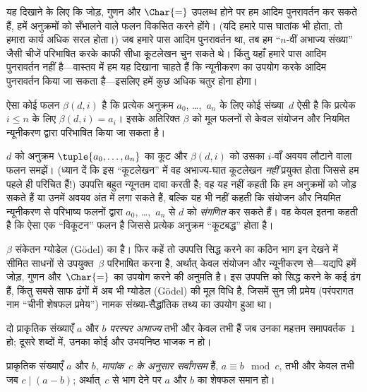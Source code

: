 \documentclass[../../../include/open-logic-section]{subfiles}
\begin{document}

यह दिखाने के लिए कि जोड़, गुणन और $\Char{=}$ उपलब्ध होने पर हम आदिम
पुनरावर्तन कर सकते हैं, हमें अनुक्रमों को सँभालने वाले फलन विकसित करने
होंगे। (यदि हमारे पास घातांक भी होता, तो हमारा कार्य अधिक सरल होता।) जब
हमारे पास आदिम पुनरावर्तन था, तब हम ``$n$-वीं अभाज्य संख्या'' जैसी चीजें
परिभाषित करके काफी सीधा कूटलेखन चुन सकते थे। किंतु यहाँ हमारे पास आदिम
पुनरावर्तन नहीं है---वास्तव में हम यह दिखाना चाहते हैं कि न्यूनीकरण का
उपयोग करके आदिम पुनरावर्तन किया जा सकता है---इसलिए हमें कुछ अधिक चतुर होना
होगा।

\begin{lem}
ऐसा कोई फलन $\beta(d,i)$ है कि प्रत्येक अनुक्रम $a_0$, \dots,~$a_n$ के
लिए कोई संख्या~$d$ ऐसी है कि प्रत्येक $i \le n$ के लिए
$\beta(d,i) = a_i$। इसके अतिरिक्त $\beta$ को मूल फलनों से केवल संयोजन और
नियमित न्यूनीकरण द्वारा परिभाषित किया जा सकता है।
\end{lem}

$d$ को अनुक्रम $\tuple{a_0, \dots, a_n}$ का कूट और $\beta(d,i)$ को उसका
$i$-वाँ अवयव लौटाने वाला फलन समझें। (ध्यान दें कि इस ``कूटलेखन'' में वह
अभाज्य-घात कूटलेखन \emph{नहीं} प्रयुक्त होता जिससे हम पहले ही परिचित हैं!)
उपपत्ति बहुत न्यूनतम दावा करती है; वह यह नहीं कहती कि हम अनुक्रमों को जोड़
सकते हैं या उनमें अवयव अंत में लगा सकते हैं, बल्कि यह भी नहीं कहती कि
संयोजन और नियमित न्यूनीकरण से परिभाष्य फलनों द्वारा $a_0$, \dots,~$a_n$ से
$d$ को \emph{संगणित} कर सकते हैं। वह केवल इतना कहती है कि ऐसा एक
``विकूटन'' फलन है जिससे प्रत्येक अनुक्रम ``कूटबद्ध'' होता है।

$\beta$ संकेतन ग्योडेल (G\"odel) का है। फिर कहें तो उपपत्ति सिद्ध करने का
कठिन भाग इन देखने में सीमित साधनों से उपयुक्त~$\beta$ परिभाषित करना है,
अर्थात् केवल संयोजन और न्यूनीकरण से---यद्यपि हमें जोड़, गुणन और~$\Char{=}$
का उपयोग करने की अनुमति है। इस उपपत्ति को सिद्ध करने के कई ढंग हैं, किंतु
सबसे साफ ढंगों में अब भी ग्योडेल (G\"odel) की मूल विधि है, जिसमें सुन ज़ी प्रमेय
(परंपरागत नाम ``चीनी शेषफल प्रमेय'') नामक संख्या-सैद्धांतिक तथ्य का उपयोग
हुआ था।

\begin{defn}
दो प्राकृतिक संख्याएँ $a$ और $b$ \emph{परस्पर अभाज्य} तभी और केवल तभी हैं
जब उनका महत्तम समापवर्तक~$1$ हो; दूसरे शब्दों में, उनका कोई और उभयनिष्ठ
भाजक न हो।
\end{defn}

\begin{defn}
प्राकृतिक संख्याएँ $a$ और $b$, \emph{मापांक~$c$ के अनुसार सर्वांगसम} हैं,
$a \equiv b \mod c$, तभी और केवल तभी जब $c \mid (a-b)$; अर्थात्~$c$ से
भाग देने पर $a$ और $b$ का शेषफल समान हो।
\end{defn}
\end{document}
